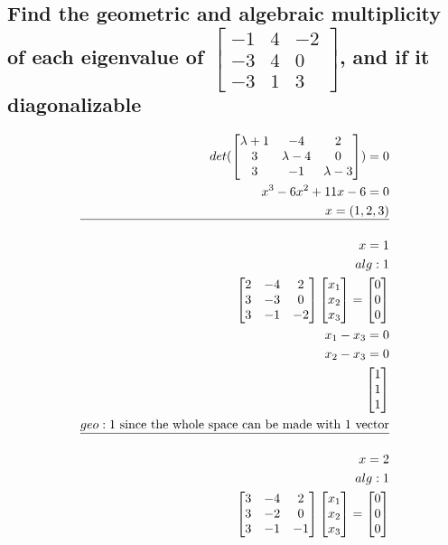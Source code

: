 \documentclass[12pt, a4paper]{article}
\begin{document}
		\subsection{Find the geometric and algebraic multiplicity of each eigenvalue of $\begin{bmatrix}-1&4&-2\\-3&4&0\\-3&1&3\end{bmatrix}$, and if it diagonalizable}
			\begin{align*}
				det(\begin{bmatrix}\lambda+1&-4&2\\3&\lambda-4&0\\3&-1&\lambda-3\end{bmatrix})=0\\
				x^3-6x^2+11x-6=0\\
				x=(1,2,3)\\
				\hline\\
				x=1\\
				alg: 1 \\
				\begin{bmatrix}2&-4&2\\3&-3&0\\3&-1&-2\end{bmatrix}\begin{bmatrix}x_1\\x_2\\x_3\end{bmatrix}=\begin{bmatrix}0\\0\\0\end{bmatrix}\\
				x_1-x_3=0\\
				x_2-x_3=0\\
				\begin{bmatrix}1\\1\\1\end{bmatrix}\\
				geo: 1 \text{ since the whole space can be made with 1 vector}\\
				\hline\\
				x=2\\
				alg: 1 \\
				\begin{bmatrix}3&-4&2\\3&-2&0\\3&-1&-1\end{bmatrix}\begin{bmatrix}x_1\\x_2\\x_3\end{bmatrix}=\begin{bmatrix}0\\0\\0\end{bmatrix}\\

\end{align*}
\end{document}
